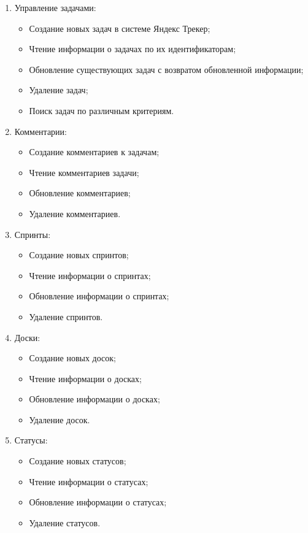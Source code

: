\documentclass[utf8, russian]{eskdtext}
\begin{document}
\begin{enumerate}
\item{ Управление задачами:}
\begin{itemize}
    \item Создание новых задач в системе Яндекс Трекер;
    \item Чтение информации о задачах по их идентификаторам;
    \item Обновление существующих задач с возвратом обновленной информации;
    \item Удаление задач;
    \item Поиск задач по различным критериям.
\end{itemize}

\item{ Комментарии:}
\begin{itemize}
    \item Создание комментариев к задачам;
    \item Чтение комментариев задачи;
    \item Обновление комментариев;
    \item Удаление комментариев.
\end{itemize}

\item{ Спринты:}
\begin{itemize}
    \item Создание новых спринтов;
    \item Чтение информации о спринтах;
    \item Обновление информации о спринтах;
    \item Удаление спринтов.
\end{itemize}

\item{ Доски:}
\begin{itemize}
    \item Создание новых досок;
    \item Чтение информации о досках;
    \item Обновление информации о досках;
    \item Удаление досок.
\end{itemize}

\item{ Статусы:}
\begin{itemize}
    \item Создание новых статусов;
    \item Чтение информации о статусах;
    \item Обновление информации о статусах;
    \item Удаление статусов.
\end{itemize}


\end{enumerate}
\end{document}
